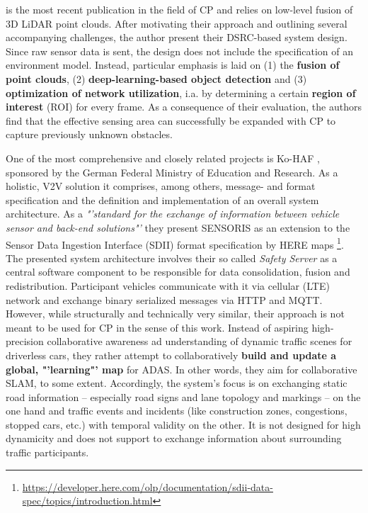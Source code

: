 \cite{Chen2019} is the most recent publication in the field of CP and relies on low-level fusion of 3D LiDAR point clouds. After motivating their approach and outlining several accompanying challenges, the author present their DSRC-based system design. Since raw sensor data is sent, the design does not include the specification of an environment model. Instead, particular emphasis is laid on (1) the \textbf{fusion of point clouds}, (2)\textbf{ deep-learning-based object detection} and (3) \textbf{optimization of network utilization}, i.a. by determining a certain \textbf{region of interest} (ROI) for every frame. As a consequence of their evaluation, the authors find that the effective sensing area can successfully be expanded with CP to capture previously unknown obstacles. 
\par
\bigskip

One of the most comprehensive and closely related projects is Ko-HAF \cite{Hohm2019}, sponsored by the German Federal Ministry of Education and Research. As a holistic, V2V solution it comprises, among others, message- and format specification and the definition and implementation of an overall system architecture. As a \textit{"'standard for the exchange of information between vehicle sensor and back-end solutions"'} they present SENSORIS as an extension to the Sensor Data Ingestion Interface (SDII) format specification by HERE maps \footnote{\url{https://developer.here.com/olp/documentation/sdii-data-spec/topics/introduction.html}}. The presented system architecture involves their so called \textit{Safety Server} as a central software component to be responsible for data consolidation, fusion and redistribution. Participant vehicles communicate with it via cellular (LTE) network and exchange binary serialized messages via HTTP and MQTT. However, while structurally and technically very similar, their approach is not meant to be used for CP in the sense of this work. Instead of aspiring high-precision collaborative awareness ad understanding of dynamic traffic scenes for driverless cars, they rather attempt to collaboratively \textbf{build and update a global, "'learning"' map} for ADAS. In other words, they aim for collaborative SLAM, to some extent. Accordingly, the system's focus is on exchanging static road information – especially road signs and lane topology and markings – on the one hand and traffic events and incidents (like construction zones, congestions, stopped cars, etc.) with temporal validity on the other. It is not designed for high dynamicity and does not support to exchange information about surrounding traffic participants. 

